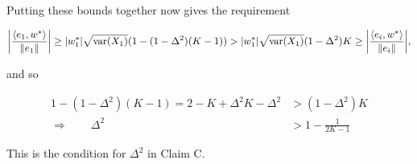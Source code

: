 \noindent Putting these bounds together now gives the requirement

\[
\bigg\vert \frac{\langle e_1, w^* \rangle}{\Vert e_1 \Vert} \bigg\vert
\ge \vert w^*_1 \vert \sqrt{\mathrm{var}(X_1)}(1 - (1 - \Delta^2) (K-1))
> \vert w^*_1 \vert \sqrt{\mathrm{var}(X_1)} (1 - \Delta^2) K
\ge \bigg\vert \frac{\langle e_i, w^* \rangle}{\Vert e_i \Vert} \bigg\vert,
\]

\noindent and so

\begin{align*}
1 - (1 - \Delta^2) (K-1) = 2 - K + \Delta^2 K - \Delta^2 &> (1 - \Delta^2) K \\
\Rightarrow \qquad \Delta^2 &> 1 - \frac{1}{2 K - 1}
\end{align*}

\noindent  This is the condition for $\Delta^2$ in Claim C.
